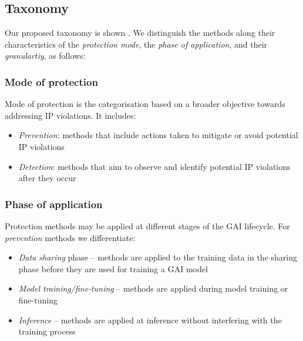 \documentclass[conference,table]{IEEEtran} %
\begin{document}

\subsection{Taxonomy}\label{sec:mitigation-taxonomy}
Our proposed taxonomy is shown . We distinguish the methods along their characteristics of the \textit{protection mode}, the \textit{phase of application}, and their \textit{granulartiy}, as follows:
\subsubsection{Mode of protection}
Mode of protection is the categorisation based on a broader objective towards addressing IP violations. 
It includes:
\begin{itemize}
    \item \textit{Prevention}: methods that include actions taken to mitigate or avoid potential IP violations  
    \item \textit{Detection}: methods that aim to observe and identify potential IP violations after they occur
\end{itemize}
\subsubsection{Phase of application}
Protection methods may be applied at different stages of the GAI lifecycle. 
For \textit{prevention} methods we differentiate:
\begin{itemize}
    \item \textit{Data sharing} phase -- methods are applied to the training data in the sharing phase before they are used for training a GAI model
    \item \textit{Model training/fine-tuning} -- methods are applied during model training or fine-tuning
    \item \textit{Inference} -- methods are applied at inference without interfering with the training process
\end{itemize}
\end{document}
